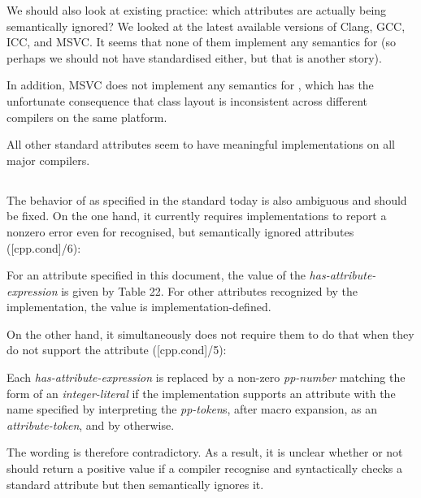 We should also look at existing practice: which attributes are actually being semantically ignored? We looked at the latest available versions of Clang, GCC, ICC, and MSVC. It seems that none of them implement any semantics for  (so perhaps we should not have standardised  either, but that is another story).

In addition, MSVC does not implement any semantics for , which has the unfortunate consequence that class layout is inconsistent across different compilers on the same platform.

All other standard attributes seem to have meaningful implementations on all major compilers.

\subsection{}

The behavior of  as specified in the standard today is also ambiguous and should be fixed. On the one hand, it currently requires implementations to report a nonzero
error even for recognised, but semantically ignored attributes ([cpp.cond]/6):

\begin{adjustwidth}{0.5cm}{0.5cm}
For an attribute specified in this document, the value of the \emph{has-attribute-expression} is given by Table 22. For other attributes recognized by the implementation, the value is implementation-defined.
\end{adjustwidth}

On the other hand, it simultaneously does not require them to do that when they do not support the attribute ([cpp.cond]/5):

\begin{adjustwidth}{0.5cm}{0.5cm}
Each \emph{has-attribute-expression} is replaced by a non-zero \emph{pp-number} matching the form of an \emph{integer-literal} if the implementation supports an attribute with the name specified by interpreting the \emph{pp-token}s, after macro expansion, as an \emph{attribute-token}, and by  otherwise.
\end{adjustwidth}

The wording is therefore contradictory. As a result, it is unclear whether or not \mbox{} should return a positive value if a compiler recognise and syntactically checks a standard attribute but then semantically ignores it. 

